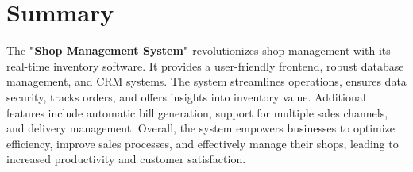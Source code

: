 \section{Summary}
The \textbf{"Shop Management System"} revolutionizes shop  
 management with its real-time inventory software. It provides a user-friendly frontend, robust database management, and CRM systems. The system streamlines operations, ensures data security, tracks orders, and offers insights into inventory value. Additional features include automatic bill generation, support for multiple sales channels, and delivery management. Overall, the system empowers businesses to optimize efficiency, improve sales processes, and effectively manage their shops, leading to increased productivity and customer satisfaction.